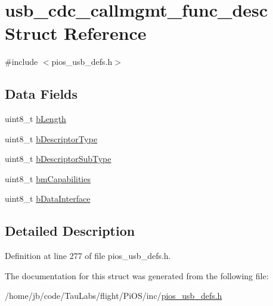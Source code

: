 \hypertarget{structusb__cdc__callmgmt__func__desc}{\section{usb\-\_\-cdc\-\_\-callmgmt\-\_\-func\-\_\-desc \-Struct \-Reference}
\label{structusb__cdc__callmgmt__func__desc}
}


{\ttfamily \#include $<$pios\-\_\-usb\-\_\-defs.\-h$>$}

\subsection*{\-Data \-Fields}
\begin{DoxyCompactItemize}
\item 
uint8\-\_\-t \hyperlink{group___p_i_o_s___u_s_b___d_e_f_s_ga987115acb21ed11d7cf4255dc3224efb}{b\-Length}
\item 
uint8\-\_\-t \hyperlink{group___p_i_o_s___u_s_b___d_e_f_s_gaeec8cc78a5f92025f5599a0f82a33b77}{b\-Descriptor\-Type}
\item 
uint8\-\_\-t \hyperlink{group___p_i_o_s___u_s_b___d_e_f_s_ga7939fdf3f4d0475126d3b6055a11e7bb}{b\-Descriptor\-Sub\-Type}
\item 
uint8\-\_\-t \hyperlink{group___p_i_o_s___u_s_b___d_e_f_s_ga48fbc5fa8369d703a7bdc6c51400cbeb}{bm\-Capabilities}
\item 
uint8\-\_\-t \hyperlink{group___p_i_o_s___u_s_b___d_e_f_s_ga9b0af922aee941d19a36f9cc309e0094}{b\-Data\-Interface}
\end{DoxyCompactItemize}


\subsection{\-Detailed \-Description}


\-Definition at line 277 of file pios\-\_\-usb\-\_\-defs.\-h.



\-The documentation for this struct was generated from the following file\-:\begin{DoxyCompactItemize}
\item 
/home/jb/code/\-Tau\-Labs/flight/\-Pi\-O\-S/inc/\hyperlink{pios__usb__defs_8h}{pios\-\_\-usb\-\_\-defs.\-h}\end{DoxyCompactItemize}
